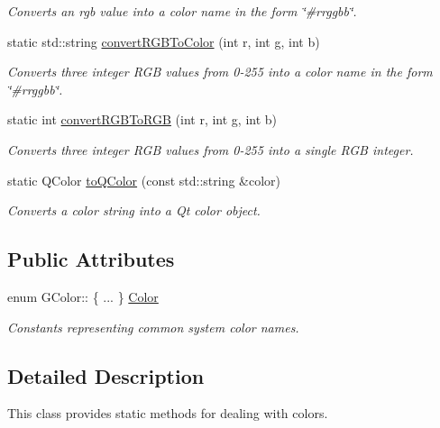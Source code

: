 \begin{DoxyCompactItemize}
\begin{DoxyCompactList}\small\item\em Converts an {\ttfamily rgb} value into a color name in the form {\ttfamily \char`\"{}\#rrggbb\char`\"{}}. \end{DoxyCompactList}\item 
static std\+::string \mbox{\hyperlink{classGColor_a906729a293e62f8d112037016af21f9f}{convert\+R\+G\+B\+To\+Color}} (int r, int g, int b)
\begin{DoxyCompactList}\small\item\em Converts three integer R\+GB values from 0-\/255 into a color name in the form {\ttfamily \char`\"{}\#rrggbb\char`\"{}}. \end{DoxyCompactList}\item 
static int \mbox{\hyperlink{classGColor_a7c4acb134cfa913f8a127b300a4b10a0}{convert\+R\+G\+B\+To\+R\+GB}} (int r, int g, int b)
\begin{DoxyCompactList}\small\item\em Converts three integer R\+GB values from 0-\/255 into a single R\+GB integer. \end{DoxyCompactList}\item 
static Q\+Color \mbox{\hyperlink{classGColor_a23f62da01b905b62266904a01cfb3745}{to\+Q\+Color}} (const std\+::string \&color)
\begin{DoxyCompactList}\small\item\em Converts a color string into a Qt color object. \end{DoxyCompactList}\end{DoxyCompactItemize}
\subsection*{Public Attributes}
\begin{DoxyCompactItemize}
\item 
enum G\+Color\+:: \{ ... \}  \mbox{\hyperlink{classGColor_a829e668b6af432af22e4fe68feff8c9a}{Color}}
\begin{DoxyCompactList}\small\item\em Constants representing common system color names. \end{DoxyCompactList}\end{DoxyCompactItemize}


\subsection{Detailed Description}
This class provides static methods for dealing with colors. 

